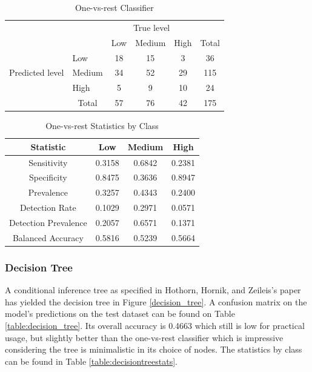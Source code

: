 \documentclass[12pt, a4paper]{article}
\begin{document}
\begin{table}[ht]
\centering
\begin{tabular}{l|l|c|c|c|c}
\multicolumn{2}{c}{}&\multicolumn{3}{c}{True level}&\\
\cline{3-5}
\multicolumn{2}{c|}{}&Low&Medium&High&\multicolumn{1}{c}{Total}\\
\cline{2-5}
\multirow{3}{*}{Predicted level}& Low & 18 & 15 & 3 & 36\\
\cline{2-5}
& Medium & 34 & 52 & 29 & 115\\
\cline{2-5}
& High & 5 & 9 & 10 & 24\\
\cline{2-5}
\multicolumn{1}{c}{} & \multicolumn{1}{c}{Total} & \multicolumn{1}{c}{57} & \multicolumn{    1}{c}{76} & \multicolumn{    1}{c}{42} & \multicolumn{1}{c}{175}\\
\end{tabular}
\caption{One-vs-rest Classifier}
\label{table:onevall}
\end{table}

\begin{table}[ht]
\centering
\begin{tabular}{||c c c c||} 
 \hline
 Statistic & Low & Medium & High \\ [0.5ex] 
 \hline\hline
 Sensitivity & 0.3158 & 0.6842 & 0.2381 \\ 
 Specificity & 0.8475 & 0.3636 & 0.8947 \\
 Prevalence & 0.3257 & 0.4343 & 0.2400 \\
 Detection Rate & 0.1029 & 0.2971 & 0.0571 \\
 Detection Prevalence  & 0.2057 & 0.6571 & 0.1371 \\ 
 Balanced Accuracy  & 0.5816 & 0.5239 & 0.5664 \\ [1ex] 
 \hline
\end{tabular}
\caption{One-vs-rest Statistics by Class}
\label{table:onevallstats}
\end{table}

\subsubsection{Decision Tree}

A conditional inference tree as specified in Hothorn, Hornik, and Zeileis's paper \cite{ctree} has yielded the decision tree in Figure \ref{decision_tree}. A confusion matrix on the model's predictions on the test dataset can be found on Table \ref{table:decision_tree}. Its overall accuracy is 0.4663 which still is low for practical usage, but slightly better than the one-vs-rest classifier which is impressive considering the tree is minimalistic in its choice of nodes. The statistics by class can be found in Table \ref{table:decisiontreestats}. 
\end{document}
